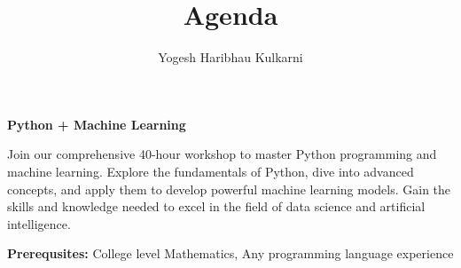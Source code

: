 \documentclass[a4paper, 11pt]{article}
\title{Agenda}
\author{Yogesh Haribhau Kulkarni}
\begin{document}
\pagestyle{mystyle}

\makebox[\linewidth]{}
\begin{center} 
\textbf{\Large Python + Machine Learning}
\end{center}
\makebox[\linewidth]{} %



Join our comprehensive 40-hour workshop to master Python programming and machine learning. Explore the fundamentals of Python, dive into advanced concepts, and apply them to develop powerful machine learning models. Gain the skills and knowledge needed to excel in the field of data science and artificial intelligence.

\makebox[\linewidth]{}

\textbf{Prerequsites:} College level Mathematics, Any programming language experience
\end{document}

